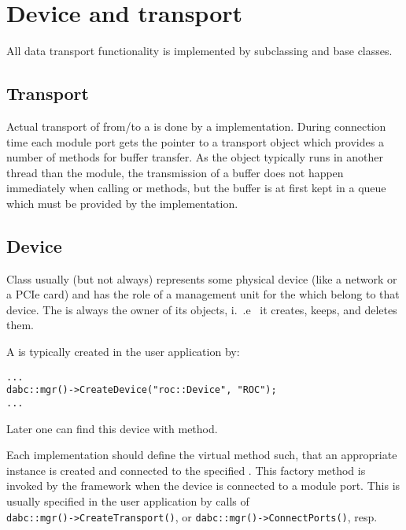\section{Device and transport}
\label{prog_plugin_device}
All data transport functionality is implemented by 
   subclassing   and  base classes.

\subsection{Transport}

Actual transport of  from/to a  is done by a  implementation.
During connection time each module port gets the pointer to a transport object
which provides a number of methods for buffer transfer. 
As the  object typically runs in another thread than the module,
the transmission of a buffer does not happen immediately when calling 
 or  methods, but
the buffer is at first kept in a queue which must be provided by the
 implementation.

 

\subsection{Device}
\label{prog_plugin_device_device}
Class  usually (but not always) represents some physical
device (like a network or a PCIe card) and has the role of a management unit for 
the  which belong to that device. 
The  is always the owner of its  objects, i.~.e~
it creates, keeps, and deletes them.

A  is typically created in the user application by:
\begin{small}
\begin{verbatim}
...
dabc::mgr()->CreateDevice("roc::Device", "ROC");
...
\end{verbatim}     
\end{small}

Later one can find this device with  method.

Each  implementation should define the virtual method  such, that an appropriate  instance 
is created and connected to the specified .
This factory method is invoked by the framework when the device is connected to 
a module port. This is usually specified in the user application by calls
of\\ 
{\tt dabc::mgr()->CreateTransport()}, or {\tt dabc::mgr()->ConnectPorts()},
resp.  

